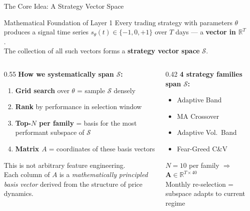 \documentclass[aspectratio=169]{beamer}
\begin{document}
\begin{frame}{The Core Idea: A Strategy Vector Space}

  \begin{block}{Mathematical Foundation of Layer 1}
    Every trading strategy with parameters $\theta$ produces a signal time series
    $s_\theta(t) \in \{-1, 0, +1\}$ over $T$ days --- a \textbf{vector in $\mathbb{R}^T$}.\\[0.4em]
    The collection of all such vectors forms a \textbf{strategy vector space} $\mathcal{S}$.
  \end{block}

  \vspace{0.5em}
  \begin{columns}[T]
    \begin{column}{0.55\textwidth}
      \textbf{How we systematically span $\mathcal{S}$:}
      \begin{enumerate}\small
        \item \textbf{Grid search} over $\theta$ = sample $\mathcal{S}$ densely
        \item \textbf{Rank} by performance in selection window
        \item \textbf{Top-$N$ per family} = basis for the most\\
              performant subspace of $\mathcal{S}$
        \item \textbf{Matrix $A$} = coordinates of these basis vectors
      \end{enumerate}

      \vspace{0.5em}
      This is not arbitrary feature engineering.\\
      Each column of $A$ is a \emph{mathematically principled basis vector}
      derived from the structure of price dynamics.
    \end{column}
    \begin{column}{0.42\textwidth}
      \small
      \textbf{4 strategy families span $\mathcal{S}$:}
      \begin{itemize}
        \item Adaptive Band
        \item MA Crossover
        \item Adaptive Vol.\ Band
        \item Fear-Greed C\&V
      \end{itemize}
      \vspace{0.3em}
      $N=10$ per family $\Rightarrow$\\
      $\mathbf{A} \in \mathbb{R}^{T \times 40}$\\[0.3em]
      Monthly re-selection = subspace adapts to current regime
    \end{column}
  \end{columns}

\end{frame}
\end{document}
